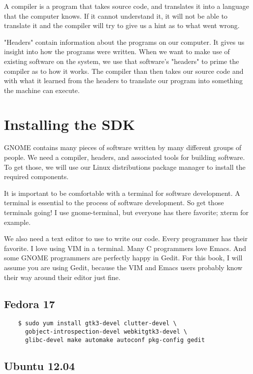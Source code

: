 A compiler is a program that takes source code, and translates it into a
language that the computer knows. If it cannot understand it, it will not be
able to translate it and the compiler will try to give us a hint as to what
went wrong.

"Headers" contain information about the programs on our computer.  It gives us
insight into how the programs were written. When we want to make use of
existing software on the system, we use that software's "headers" to prime the
compiler as to how it works. The compiler than then takes our source code and
with what it learned from the headers to translate our program into something
the machine can execute.


\section{Installing the SDK}

GNOME contains many pieces of software written by many different groups of
people. We need a compiler, headers, and associated tools for building
software. To get those, we will use our Linux distributions package manager to
install the required components.

It is important to be comfortable with a terminal for software development. A
terminal is essential to the process of software development. So get those
terminals going! I use gnome-terminal, but everyone has there favorite; xterm
for example.

We also need a text editor to use to write our code. Every programmer has their
favorite. I love using VIM in a terminal. Many C programmers love Emacs. And
some GNOME programmers are perfectly happy in Gedit. For this book, I will
assume you are using Gedit, because the VIM and Emacs users probably know their
way around their editor just fine.


\subsection{Fedora 17}

\begin{Verbatim}
    $ sudo yum install gtk3-devel clutter-devel \
      gobject-introspection-devel webkitgtk3-devel \
      glibc-devel make automake autoconf pkg-config gedit
\end{Verbatim}


\subsection{Ubuntu 12.04}

